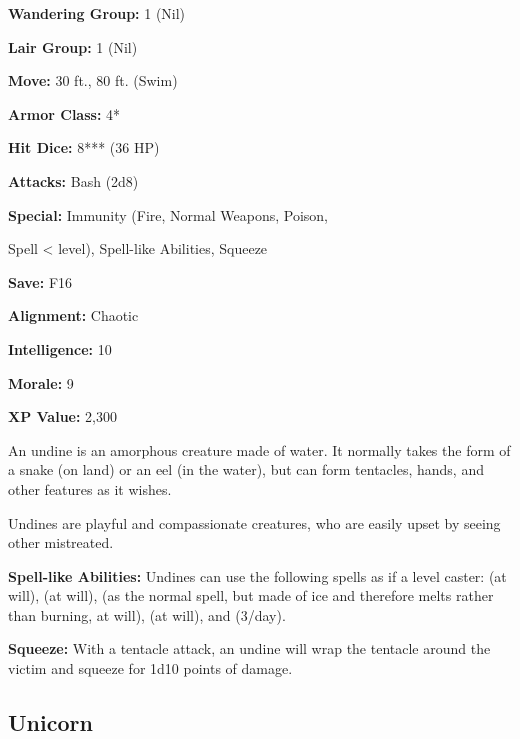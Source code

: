 \begin{multicols*}{2}
{\textbf{Wandering Group:} 1 (Nil)

\textbf{Lair Group:} 1 (Nil)

\textbf{Move:} 30 ft., 80 ft. (Swim)

\textbf{Armor Class:} 4*

\textbf{Hit Dice:} 8*** (36 HP)

\textbf{Attacks:} Bash (2d8)

\textbf{Special:} Immunity (Fire, Normal Weapons, Poison, 

Spell <  level), Spell-like Abilities, Squeeze

\textbf{Save:} F16

\textbf{Alignment:} Chaotic

\textbf{Intelligence:} 10

\textbf{Morale:} 9

\textbf{XP Value:} 2,300}

An undine is an amorphous creature made of water. It normally takes the form of a snake (on land) or an eel (in the water), but can form tentacles, hands, and other features as it wishes.

Undines are playful and compassionate creatures, who are easily upset by seeing other mistreated.

\textbf{Spell-like Abilities:} Undines can use the following spells as if a  level caster:  (at will),  (at will),  (as the normal spell, but made of ice and therefore melts rather than burning, at will),  (at will), and  (3/day).

\textbf{Squeeze:} With a tentacle attack, an undine will wrap the tentacle around the victim and squeeze for 1d10 points of damage.

\subsection{Unicorn}
\end{multicols*}
